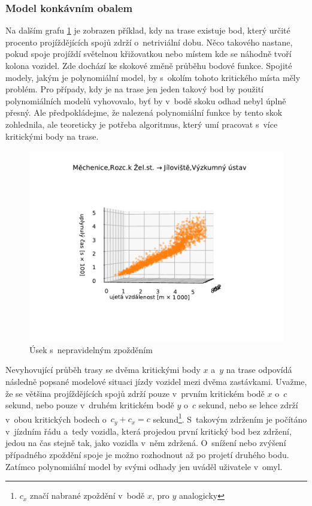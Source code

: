 \subsubsection{Model konkávním obalem}


Na dalším grafu \ref{fig:nepredvidatelne_zdrzeni} je zobrazen příklad, kdy na trase existuje bod, který určité procento projíždějících spojů zdrží o~netriviální dobu. Něco takového nastane, pokud spoje projíždí světelnou křižovatkou nebo místem kde se náhodně tvoří kolona vozidel. Zde dochází ke skokové změně průběhu bodové funkce. Spojité modely, jakým je polynomiální model, by s~okolím tohoto kritického místa měly problém. Pro případy, kdy je na trase jen jeden takový bod by použití polynomiálních modelů vyhovovalo, byť by v~bodě skoku odhad nebyl úplně přesný. Ale předpokládejme, že nalezená polynomiální funkce by tento skok zohlednila, ale teoreticky je potřeba algoritmus, který umí pracovat s~více kritickými body na trase.


\begin{figure}
\centering
  \includegraphics[width=\linewidth]{../img/1128_1129}
  \caption{Úsek s~nepravidelným zpožděním}
  \label{fig:nepredvidatelne_zdrzeni}
\end{figure}


\bigbreak

Nevyhovující průběh trasy se dvěma kritickými body $x$ a~$y$ na trase odpovídá následně popsané modelové situaci jízdy vozidel mezi dvěma zastávkami. Uvažme, že se většina projíždějících spojů zdrží pouze v~prvním kritickém bodě $x$ o~$c$ sekund, nebo pouze v~druhém kritickém bodě $y$ o~$c$ sekund, nebo se lehce zdrží v~obou kritických bodech o~$c_y + c_x = c$ sekund\footnote{$c_x$ značí nabrané zpoždění v~bodě $x$, pro $y$ analogicky}. S~takovým zdržením je počítáno v~jízdním řádu a~tedy vozidla, která projedou první kritický bod bez zdržení, jedou na čas stejně tak, jako vozidla v~něm zdržená. O~snížení nebo zvýšení případného zpoždění spoje je možno rozhodnout až po projetí druhého bodu. Zatímco polynomiální model by svými odhady jen uváděl uživatele v~omyl.


